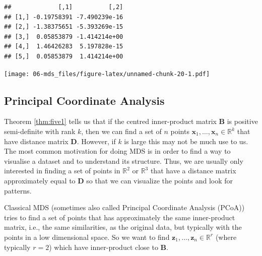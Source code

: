 \documentclass[]{book}
\newenvironment{Shaded}{\begin{snugshade}}{\end{snugshade}}
\newcommand{\DecValTok}[1]{\textcolor[rgb]{0.00,0.00,0.81}{#1}}
\newcommand{\KeywordTok}[1]{\textcolor[rgb]{0.13,0.29,0.53}{\textbf{#1}}}
\newcommand{\NormalTok}[1]{#1}
\newcommand{\OperatorTok}[1]{\textcolor[rgb]{0.81,0.36,0.00}{\textbf{#1}}}
\newcommand{\StringTok}[1]{\textcolor[rgb]{0.31,0.60,0.02}{#1}}
\theoremstyle{definition}
\theoremstyle{definition}
\theoremstyle{definition}
\theoremstyle{remark}
\begin{document}
\begin{Shaded}
\end{Shaded}

\begin{verbatim}
##             [,1]          [,2]
## [1,] -0.19758391 -7.490239e-16
## [2,] -1.38375651 -5.393269e-15
## [3,]  0.05853879 -1.414214e+00
## [4,]  1.46426283  5.197828e-15
## [5,]  0.05853879  1.414214e+00
\end{verbatim}

\texttt{[image: 06-mds\_files/figure-latex/unnamed-chunk-20-1.pdf]}

\hypertarget{principal-coordinate-analysis}{%
\subsection{Principal Coordinate Analysis}\label{principal-coordinate-analysis}}

Theorem \ref{thm:five1} tells us that if the centred inner-product matrix
\(\mathbf B\) is positive semi-definite with rank \(k\), then we can find a set of \(n\) points \(\mathbf x_1,\ldots, \mathbf x_n \in \mathbb{R}^k\) that have distance matrix \(\mathbf D\). However, if \(k\) is large this may not be much use to us. The most common motivation for doing MDS is in order to find a way to visualise a dataset and to understand its structure. Thus, we are usually only interested in finding a set of points in \(\mathbb{R}^2\) or \(\mathbb{R}^3\) that have a distance matrix approximately equal to \(\mathbf D\) so that we can visualize the points and look for patterns.

Classical MDS (sometimes also called Principal Coordinate Analysis (PCoA)) tries to find a set of points that has approximately the same inner-product matrix, i.e., the same similarities, as the original data, but typically with the points in a low dimensional space. So we want to find \(\mathbf z_1, \ldots, \mathbf z_n \in \mathbb{R}^r\) (where typically \(r=2\)) which have inner-product close to \(\mathbf B\).
\end{document}

